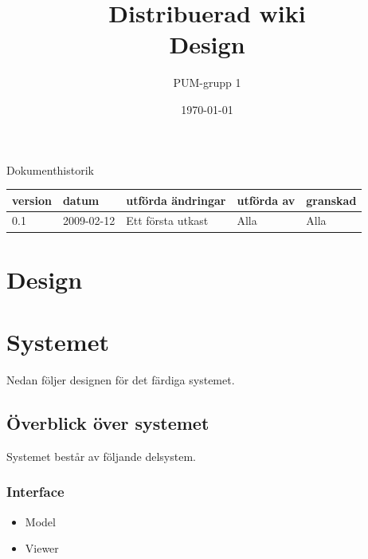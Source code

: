 

\ifpdf
\else
\fi

\title{Distribuerad wiki \\ Design}
\author{PUM-grupp 1}
\date{\today}



\maketitle

\thispagestyle{empty}

\newpage

{\centering \Large{Dokumenthistorik\\}}

\vspace{10pt}
\begin{tabularx}{\textwidth}{ |l|l|X|l|l| }
  \hline
    \textbf{version} & \textbf{datum} & \textbf{utförda ändringar} & \textbf{utförda av} & \textbf{granskad} \\
	\hline 
  0.1 & 2009-02-12 &  Ett första utkast  & Alla & Alla   \\
  \hline
\end{tabularx}

\newpage

\setcounter{tocdepth}{2}
\tableofcontents
\newpage

\section{Design}

\section{Systemet}
Nedan följer designen för det färdiga systemet.
\subsection{Överblick över systemet}
Systemet består av följande delsystem.
\subsubsection{Interface}
\begin{itemize}
\item Model
\item Viewer
\end{itemize}
